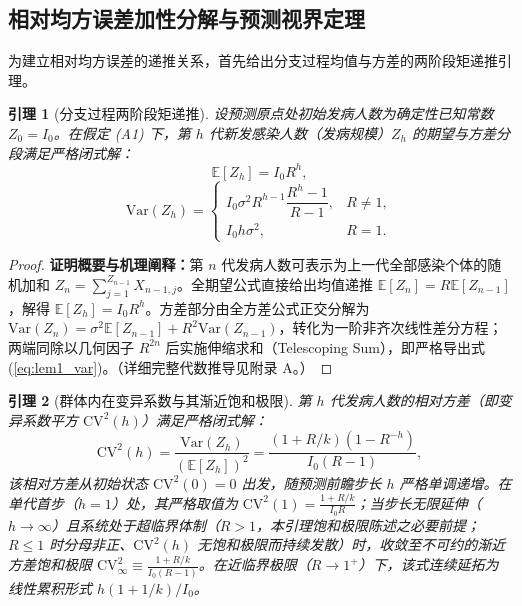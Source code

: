 \documentclass[11pt,a4paper]{article}
\theoremstyle{plain}
\newtheorem{lemma}{引理}
\theoremstyle{definition}
\begin{document}
\subsection{相对均方误差加性分解与预测视界定理}

为建立相对均方误差的递推关系，首先给出分支过程均值与方差的两阶段矩递推引理。

\begin{lemma}[分支过程两阶段矩递推]\label{lem:branch_moments}
设预测原点处初始发病人数为确定性已知常数 $Z_0 = I_0$。在假定 (A1) 下，第 $h$ 代新发感染人数（发病规模）$Z_h$ 的期望与方差分段满足严格闭式解：
\begin{equation}
\mathbb{E}[Z_h] = I_0 R^h,
\end{equation}
\begin{equation}
\text{Var}(Z_h) = \begin{cases}
I_0 \sigma^2 R^{h-1} \dfrac{R^h - 1}{R - 1}, & R \neq 1, \\[8pt]
I_0 h \sigma^2, & R = 1.
\end{cases}
\label{eq:lem1_var}
\end{equation}
\end{lemma}

\begin{proof}
\textbf{证明概要与机理阐释：}第 $n$ 代发病人数可表示为上一代全部感染个体的随机加和 $Z_n = \sum_{j=1}^{Z_{n-1}} X_{n-1, j}$。全期望公式直接给出均值递推 $\mathbb{E}[Z_n] = R \mathbb{E}[Z_{n-1}]$，解得 $\mathbb{E}[Z_h] = I_0 R^h$。方差部分由全方差公式正交分解为 $\text{Var}(Z_n) = \sigma^2 \mathbb{E}[Z_{n-1}] + R^2 \text{Var}(Z_{n-1})$，转化为一阶非齐次线性差分方程；两端同除以几何因子 $R^{2n}$ 后实施伸缩求和（Telescoping Sum），即严格导出式 (\ref{eq:lem1_var})。（详细完整代数推导见附录 A。）
\end{proof}

\begin{lemma}[群体内在变异系数与其渐近饱和极限]\label{lem:cv_floor}
第 $h$ 代发病人数的相对方差（即变异系数平方 $\text{CV}^2(h)$）满足严格闭式解：
\begin{equation}
\text{CV}^2(h) = \frac{\text{Var}(Z_h)}{(\mathbb{E}[Z_h])^2} = \frac{(1 + R/k)(1 - R^{-h})}{I_0(R - 1)},
\label{eq:cv_floor}
\end{equation}
该相对方差从初始状态 $\text{CV}^2(0)=0$ 出发，随预测前瞻步长 $h$ 严格单调递增。在单代首步（$h=1$）处，其严格取值为 $\text{CV}^2(1) = \frac{1+R/k}{I_0 R}$；当步长无限延伸（$h \to \infty$）且系统处于超临界体制（$R > 1$，本引理饱和极限陈述之必要前提；$R\le1$ 时分母非正、$\text{CV}^2(h)$ 无饱和极限而持续发散）时，收敛至不可约的渐近方差饱和极限 $\text{CV}^2_\infty \equiv \frac{1 + R/k}{I_0(R - 1)}$。在近临界极限（$R \to 1^+$）下，该式连续延拓为线性累积形式 $h(1+1/k)/I_0$。
\end{lemma}
\end{document}
